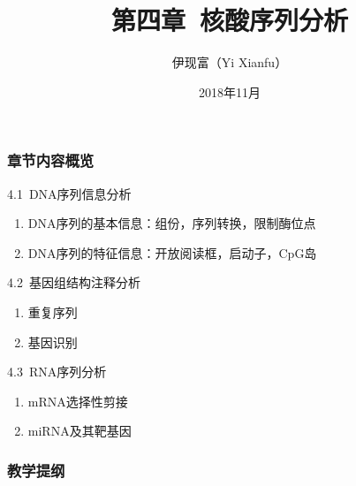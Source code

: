 




\title[核酸序列分析]{第四章\ 核酸序列分析}
\author[Yixf]{伊现富（Yi Xianfu）}
\date{2018年11月}

\begin{frame}
  \titlepage
\end{frame}

\begin{frame}
  \frametitle{章节内容概览}
  \begin{block}{4.1\ DNA序列信息分析}
    \begin{enumerate}
      \item DNA序列的基本信息：组份，序列转换，限制酶位点
      \item DNA序列的特征信息：开放阅读框，启动子，CpG岛
    \end{enumerate}
  \end{block}
  \vspace{-0.2cm}
  \begin{block}{4.2\ 基因组结构注释分析}
    \begin{enumerate}
      \item 重复序列
      \item 基因识别
    \end{enumerate}
  \end{block}
  \vspace{-0.2cm}
  \begin{block}{4.3\ RNA序列分析}
    \begin{enumerate}
      \item mRNA选择性剪接
      \item miRNA及其靶基因
    \end{enumerate}
  \end{block}
\end{frame}

\begin{frame}[plain]
  \frametitle{教学提纲}
  \setcounter{tocdepth}{2}
  \begin{multicols}{2}
  \tableofcontents
  \end{multicols}
\end{frame}








